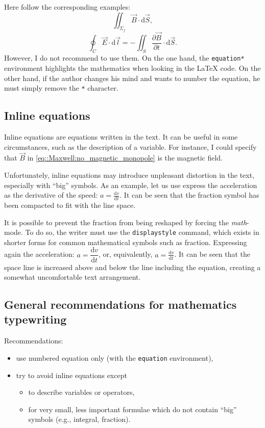 		Here follow the corresponding examples:
		$$ \iint_{\Sigma_f} \vec{B} \cdot \mathrm{d}\vec{S}, $$
		\[ \oint_{C} \vec{E} \cdot \mathrm{d}\vec{l} = - \iint_{S} \frac{\partial\vec{B}}{\partial t} \cdot \mathrm{d}\vec{S}. \]
		However, I do not recommend to use them. 
		On the one hand, the \texttt{equation*} environment highlights the mathematics when looking in the \LaTeX{} code.
		On the other hand, if the author changes his mind and wants to number the equation, he must simply remove the \texttt{*} character.
	
	
	\subsection{Inline equations}
	
		Inline equations are equations written in the text.
		It can be useful in some circumstances, such as the description of a variable.
		For instance, I could specify that $\vec{B}$ in \cref{eq::Maxwell:no_magnetic_monopole} is the magnetic field.
		
		Unfortunately, inline equations may introduce unpleasant distortion in the text, especially with \enquote{big} symbols.
		As an example, let us use express the acceleration as the derivative of the speed:
		$a=\frac{\mathrm{d}v}{\mathrm{d}t}$.
		It can be seen that the fraction symbol has been compacted to fit with the line space.
		
		It is possible to prevent the fraction from being reshaped by forcing the \textit{math}-mode.
		To do so, the writer must use the \texttt{displaystyle} command, which exists in shorter forms for common mathematical symbols such as fraction.
		Expressing again the acceleration:
		$a=\dfrac{\mathrm{d}v}{\mathrm{d}t}$, or, equivalently,
		$\displaystyle a=\frac{\mathrm{d}v}{\mathrm{d}t}$.
		It can be seen that the space line is increased above and below the line including the equation, creating a somewhat uncomfortable text arrangement.
		
	
	\subsection{General recommendations for mathematics typewriting}
		
		Recommendations:
		\begin{itemize}
			\item use numbered equation only (with the \texttt{equation} environment),
			\item try to avoid inline equations except
			\begin{itemize}
				\item to describe variables or operators,
				\item for very small, less important formulae which do not contain \enquote{big} symbols (e.g., integral, fraction).
			\end{itemize}
		\end{itemize}


